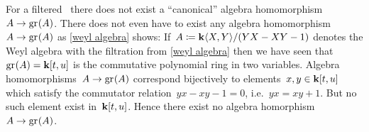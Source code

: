 %


\begin{warning}
  For a filtered~{\algebra{$\kf$}} there does not exist a \enquote{canonical} algebra homomorphism~$A \to \gr(A)$.
  There does not even have to exist any algebra homomorphism~$A \to \gr(A)$ as \cref{weyl algebra} shows:
  If~$A \coloneqq \mathbf{k}\langle X,Y\rangle/(YX - XY - 1)$ denotes the Weyl algebra with the filtration from \cref{weyl algebra} then we have seen that~$\gr(A) = \kf[t,u]$ is the commutative polynomial ring in two variables.
  Algebra homomorphisms~$A \to \gr(A)$ correspond bijectively to elements~$x, y \in \mathbf{k}[t,u]$ which satisfy the commutator relation~$yx - xy -1 = 0$, i.e.~$yx = xy + 1$.
  But no such element exist in~$\mathbf{k}[t,u]$.
  Hence there exist no algebra homorphism~$A \to \gr(A)$.
\end{warning}



